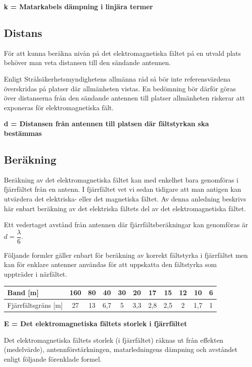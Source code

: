 \textbf{k = Matarkabels dämpning i linjära termer}

\subsection{Distans}

För att kunna beräkna nivån på det elektromagnetiska fältet på en utvald plats
behöver man veta distansen till den sändande antennen.

Enligt Strålsäkerhetsmyndighetens allmänna råd så bör inte referensvärdena
överskridas på platser där allmänheten vistas.
En bedömning bör därför göras över distanserna från den sändande antennen till
platser allmänheten riskerar att exponeras för elektromagnetiska fält.

\textbf{d = Distansen från antennen till platsen där fältstyrkan ska bestämmas}

\subsection{Beräkning}

Beräkning av det elektromagnetiska fältet kan med enkelhet bara
genomföras i fjärrfältet från en antenn.
I fjärrfältet vet vi sedan tidigare att man antigen kan utvärdera det
elektriska- eller det magnetiska fältet.
Av denna anledning beskrivs här enbart beräkning av det elektriska fältets del av
det elektromagnetiska fältet.

Ett vedertaget avstånd från antennen där fjärrfältsberäkningar kan genomföras
är \(d=\dfrac{\lambda}{6}\). 

Följande formler gäller enbart för beräkning av korrekt fältstyrka i
fjärrfältet men kan för enklare antenner användas för att uppskatta den
fältstyrka som uppträder i närfältet.

\begin{tabular}{|l|c|c|c|c|c|c|c|c|c|c|}
	\hline
	Band [m] & 160 & 80 & 40 & 30 & 20 & 17 & 15 & 12 & 10 & 6 \\ \hline
	Fjärrfältsgräns [m] & 27 & 13 & 6,7 & 5 & 3,3 & 2,8 & 2,5 & 2 & 1,7 & 1 \\ \hline
\end{tabular}

\textbf{E = Det elektromagnetiska fältets storlek i fjärrfältet}

Det elektromagnetiska fältets storlek (i fjärrfältet) räknas ut från
effekten (medelvärde), antennförstärkningen, matarledningens dämpning
och avståndet enligt följande förenklade formel.

